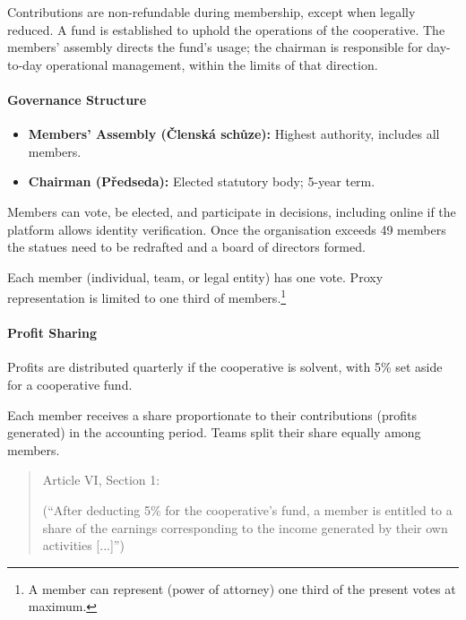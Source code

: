 Contributions are non-refundable during membership, except when legally reduced. A fund is established to uphold the operations of the cooperative. The members’ assembly directs the fund’s usage; the chairman is responsible for day-to-day operational management, within the limits of that direction.

\paragraph{Governance Structure}
\begin{itemize}
    \item \textbf{Members’ Assembly (Členská schůze):} Highest authority, includes all members.
    \item \textbf{Chairman (Předseda):} Elected statutory body; 5-year term.
\end{itemize}
Members can vote, be elected, and participate in decisions, including online if the platform allows identity verification. Once the organisation exceeds 49 members the statues need to be redrafted and a board of directors formed.

Each member (individual, team, or legal entity) has one vote. Proxy representation is limited to one third of members.\footnote{A member can represent (power of attorney) one third of the present votes at maximum.}
\paragraph{Profit Sharing}
Profits are distributed quarterly if the cooperative is solvent, with 5\% set aside for a cooperative fund.

Each member receives a share proportionate to their contributions (profits generated) in the accounting period. Teams split their share equally among members.
\begin{quote}
    Article VI, Section 1: 

    (\enquote{After deducting 5\% for the cooperative’s fund, a member is entitled to a share of the earnings corresponding to the income generated by their own activities [...]})
\end{quote}

